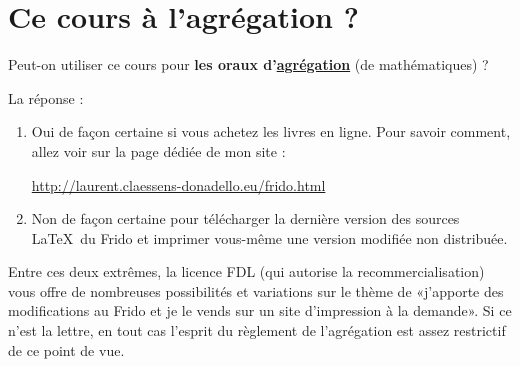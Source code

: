 
\section*{Ce cours à l'agrégation ?}

Peut-on utiliser ce cours pour \textbf{les oraux d'\href{http://agreg.org/}{agrégation}} (de mathématiques) ?

La réponse :
\begin{enumerate}
    \item
        Oui de façon certaine si vous achetez les livres en ligne. Pour savoir comment, allez voir sur la page dédiée de mon site :
        \begin{center}
            \url{http://laurent.claessens-donadello.eu/frido.html}
        \end{center}
    \item
        Non de façon certaine pour télécharger la dernière version des sources \LaTeX\ du Frido et imprimer vous-même une version modifiée non distribuée.
\end{enumerate}
Entre ces deux extrêmes, la licence FDL (qui autorise la recommercialisation) vous offre de nombreuses possibilités et variations sur le thème de «j'apporte des modifications au Frido et je le vends sur un site d'impression à la demande». Si ce n'est la lettre, en tout cas l'esprit du règlement de l'agrégation est assez restrictif de ce point de vue.
